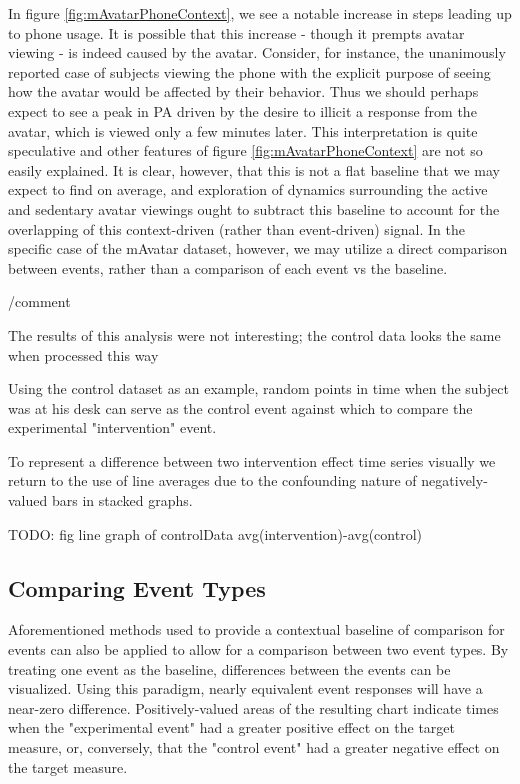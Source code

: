 In figure \ref{fig:mAvatarPhoneContext}, we see a notable increase in steps leading up to phone usage.
It is possible that this increase - though it prempts avatar viewing - is indeed caused by the avatar.
Consider, for instance, the unanimously reported case of subjects viewing the phone with the explicit purpose of seeing how the avatar would be affected by their behavior.
Thus we should perhaps expect to see a peak in PA driven by the desire to illicit a response from the avatar, which is viewed only a few minutes later.
This interpretation is quite speculative and other features of figure \ref{fig:mAvatarPhoneContext} are not so easily explained.
It is clear, however, that this is not a flat baseline that we may expect to find on average, and exploration of dynamics surrounding the active and sedentary avatar viewings ought to subtract this baseline to account for the overlapping of this context-driven (rather than event-driven) signal.
In the specific case of the mAvatar dataset, however, we may utilize a direct comparison between events, rather than a comparison of each event vs the baseline.

/comment{
The results of this analysis were not interesting; the control data looks the same when processed this way

Using the control dataset as an example, random points in time when the subject was at his desk can serve as the control event against which to compare the experimental "intervention" event.

To represent a difference between two intervention effect time series visually we return to the use of line averages due to the confounding nature of negatively-valued bars in stacked graphs.

TODO: fig line graph of controlData avg(intervention)-avg(control)
}

\subsection{Comparing Event Types}
Aforementioned methods used to provide a contextual baseline of comparison for events can also be applied to allow for a comparison between two event types.
By treating one event as the baseline, differences between the events can be visualized.
Using this paradigm, nearly equivalent event responses will have a near-zero difference.
Positively-valued areas of the resulting chart indicate times when the "experimental event" had a greater positive effect on the target measure, or, conversely, that the "control event" had a greater negative effect on the target measure.


